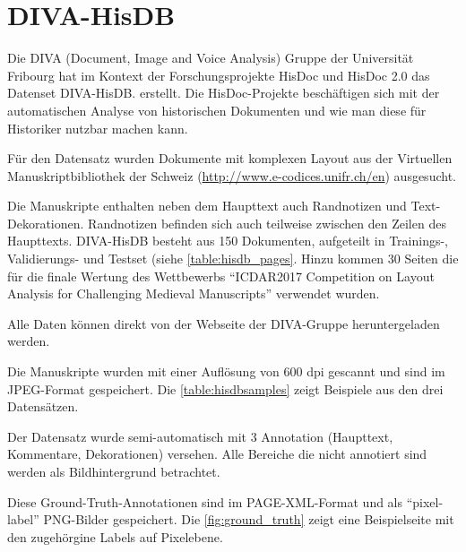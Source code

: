 \section{DIVA-HisDB}
Die DIVA  (Document, Image and Voice Analysis) Gruppe der Universität Fribourg hat im Kontext der Forschungsprojekte HisDoc und HisDoc 2.0 
das Datenset DIVA-HisDB. erstellt.
Die HisDoc-Projekte beschäftigen sich mit der automatischen Analyse von historischen Dokumenten und
wie man diese für Historiker nutzbar machen kann.

\cite{SimistiraDIVAHisDBPreciselyAnnotated2016}

Für den Datensatz wurden Dokumente mit komplexen Layout aus der Virtuellen Manuskriptbibliothek der Schweiz (\url{http://www.e-codices.unifr.ch/en}) ausgesucht. 

Die Manuskripte enthalten neben dem Haupttext auch Randnotizen und Text-Dekorationen. 
Randnotizen befinden sich auch teilweise zwischen den Zeilen des Haupttexts.
DIVA-HisDB besteht aus 150 Dokumenten, aufgeteilt in Trainings-, Validierungs- und Testset (siehe \cref{table:hisdb_pages}. 
Hinzu kommen 30 Seiten die für die finale Wertung des Wettbewerbs ``ICDAR2017 Competition on Layout Analysis for Challenging Medieval Manuscripts'' verwendet wurden.


Alle Daten können direkt von der Webseite der DIVA-Gruppe heruntergeladen werden.

Die Manuskripte wurden mit einer Auflösung von 600 dpi gescannt und sind im  JPEG-Format gespeichert. 
Die \cref{table:hisdbsamples} zeigt Beispiele aus den drei Datensätzen. 

Der Datensatz wurde semi-automatisch mit 3 Annotation (Haupttext, Kommentare, Dekorationen) versehen.
Alle Bereiche die nicht annotiert sind werden als Bildhintergrund betrachtet.

Diese Ground-Truth-Annotationen sind im PAGE-XML-Format und als ``pixel-label'' PNG-Bilder gespeichert.
Die \cref{fig:ground_truth} zeigt eine Beispielseite mit den zugehörgine Labels auf Pixelebene. 

